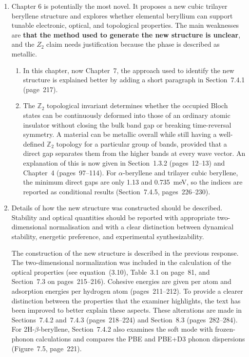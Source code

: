 \documentclass[12pt,a4paper]{article}
\newenvironment{reply}{\par\medskip\color{replyblue}}{\par\medskip}
\begin{document}
\begin{enumerate}[leftmargin=*]
\item Chapter 6 is potentially the most novel. It proposes a new cubic trilayer beryllene structure and explores whether elemental beryllium can support tunable electronic, optical, and topological properties. The main weaknesses are \textbf{that the method used to generate the new structure is unclear}, and the $Z_2$ claim needs justification because the phase is described as metallic.

\begin{reply}
\begin{enumerate}[label=(\roman*),leftmargin=*]
\item In this chapter, now Chapter~7, the approach used to identify the new structure is explained better by adding a short paragraph in Section~7.4.1 (page~217).
\item The $\mathbb{Z}_2$ topological invariant determines whether the occupied Bloch states can be continuously deformed into those of an ordinary atomic insulator without closing the bulk band gap or breaking time-reversal symmetry.
A material can be metallic overall while still having a well-defined $\mathbb{Z}_2$ topology for a particular group of bands, provided that a direct gap separates them from the higher bands at every wave vector.
An explanation of this is now given in Section~1.3.2 (pages~12--13) and Chapter~4 (pages~97--114).
For $\alpha$-beryllene and trilayer cubic beryllene, the minimum direct gaps are only 1.13 and 0.735~meV, so the indices are reported as conditional results (Section~7.4.5, pages~226--230).
\end{enumerate}
\end{reply}

\item Details of how the new structure was constructed should be described. Stability and optical quantities should be reported with appropriate two-dimensional normalisation and with a clear distinction between dynamical stability, energetic preference, and experimental synthesizability.

\begin{reply}
The construction of the new structure is described in the previous response.
The two-dimensional normalization was included in the calculation of the optical properties (see equation~(3.10), Table~3.1 on page~81, and Section~7.3 on pages~215--216).
Cohesive energies are given per atom and adsorption energies per hydrogen atom (pages~211--212).
To provide a clearer distinction between the properties that the examiner highlights, the text has been improved to better explain these aspects.
These alterations are made in Sections~7.4.2 and~7.4.3 (pages~218--224) and Section~8.3 (pages~282--284).
For 2H-$\beta$-beryllene, Section~7.4.2 also examines the soft mode with frozen-phonon calculations and compares the PBE and PBE+D3 phonon dispersions (Figure~7.5, page~221).
\end{reply}


\end{enumerate}
\end{document}
